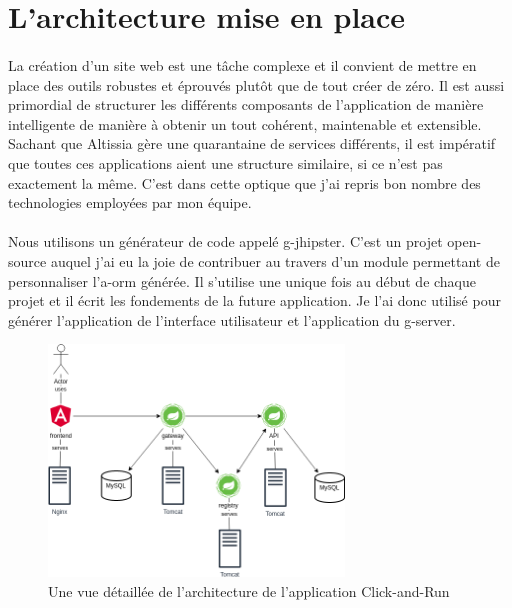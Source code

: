 \section{L'architecture mise en place}
\label{sec:architecture}

\paragraph{}
La création d'un site web est une tâche complexe et il convient de mettre en place des outils robustes et éprouvés plutôt que de tout créer de zéro.
Il est aussi primordial de structurer les différents composants de l'application de manière intelligente de manière à obtenir un tout cohérent, maintenable et extensible.
Sachant que Altissia gère une quarantaine de services différents, il est impératif que toutes ces applications aient une structure similaire, si ce n'est pas exactement la même.
C'est dans cette optique que j'ai repris bon nombre des technologies employées par mon équipe.

\paragraph{}
Nous utilisons un générateur de code appelé \gls{g-jhipster}.
C'est un projet open-source auquel j'ai eu la joie de contribuer au travers d'un module permettant de personnaliser l'\gls{a-orm} générée\cite{noauthor_generator-jhipster-db-helper_nodate}.
Il s'utilise une unique fois au début de chaque projet et il écrit les fondements de la future application.
Je l'ai donc utilisé pour générer l'application de l'interface utilisateur et l'application du \gls{g-server}.

\begin{figure}[ht]
    \centering
    \includegraphics[width=0.7\textwidth]{images/diagrams/gw-archi-detailed.png}
    \caption{Une vue détaillée de l'architecture de l'application Click-and-Run}
    \label{fig:detailed-archi}
\end{figure}

